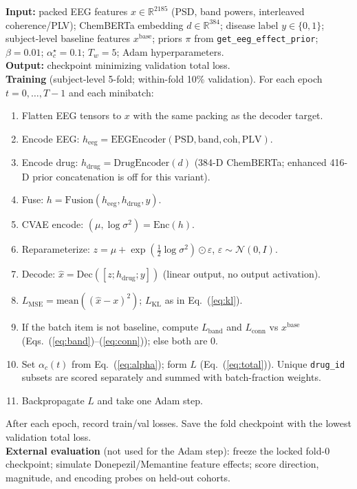 \begin{algorithm}[H]
\caption{Training procedure for the pharmacodynamically constrained CVAE.}
\label{alg:train}
\small
\textbf{Input:} packed EEG features $x\in\mathbb{R}^{2185}$ (PSD, band powers, interleaved coherence/PLV); ChemBERTa embedding $d\in\mathbb{R}^{384}$; disease label $y\in\{0,1\}$; subject-level baseline features $x^{\mathrm{base}}$; priors $\pi$ from \texttt{get\_eeg\_effect\_prior}; $\beta=0.01$; $\alpha_c^{\star}=0.1$; $T_w=5$; Adam hyperparameters.\\
\textbf{Output:} checkpoint minimizing validation total loss.\\[0.4em]
\textbf{Training} (subject-level 5-fold; within-fold 10\% validation). For each epoch $t=0,\ldots,T-1$ and each minibatch:
\begin{enumerate}
  \setlength{\itemsep}{0.15em}
  \item Flatten EEG tensors to $x$ with the same packing as the decoder target.
  \item Encode EEG: $h_{\mathrm{eeg}}=\mathrm{EEGEncoder}(\mathrm{PSD},\mathrm{band},\mathrm{coh},\mathrm{PLV})$.
  \item Encode drug: $h_{\mathrm{drug}}=\mathrm{DrugEncoder}(d)$ (384-D ChemBERTa; enhanced 416-D prior concatenation is off for this variant).
  \item Fuse: $h=\mathrm{Fusion}(h_{\mathrm{eeg}},h_{\mathrm{drug}},y)$.
  \item CVAE encode: $(\mu,\log\sigma^2)=\mathrm{Enc}(h)$.
  \item Reparameterize: $z=\mu+\exp(\tfrac12\log\sigma^2)\odot\varepsilon$, $\varepsilon\sim\mathcal{N}(0,I)$.
  \item Decode: $\hat{x}=\mathrm{Dec}([z; h_{\mathrm{drug}}; y])$ (linear output, no output activation).
  \item $L_{\mathrm{MSE}}=\mathrm{mean}((\hat{x}-x)^2)$; $L_{\mathrm{KL}}$ as in Eq.~(\ref{eq:kl}).
  \item If the batch item is not baseline, compute $L_{\mathrm{band}}$ and $L_{\mathrm{conn}}$ vs $x^{\mathrm{base}}$ (Eqs.~(\ref{eq:band})--(\ref{eq:conn})); else both are 0.
  \item Set $\alpha_c(t)$ from Eq.~(\ref{eq:alpha}); form $L$ (Eq.~(\ref{eq:total})). Unique \texttt{drug\_id} subsets are scored separately and summed with batch-fraction weights.
  \item Backpropagate $L$ and take one Adam step.
\end{enumerate}
After each epoch, record train/val losses. Save the fold checkpoint with the lowest validation total loss.\\[0.3em]
\textbf{External evaluation} (not used for the Adam step): freeze the locked fold-0 checkpoint; simulate Donepezil/Memantine feature effects; score direction, magnitude, and encoding probes on held-out cohorts.
\end{algorithm}
